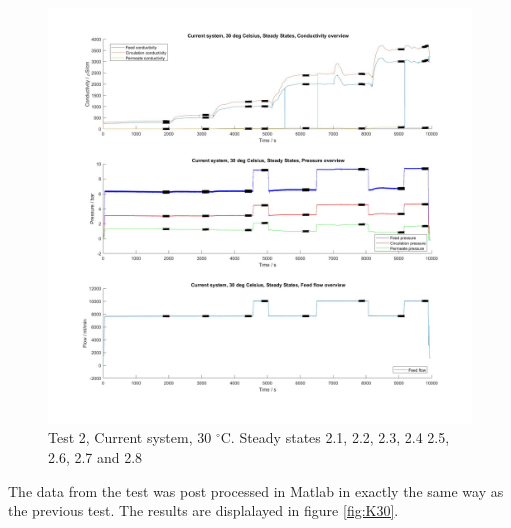 \begin{figure}[H]
    \centering
    \includegraphics[width=1.1\textwidth]{overview30}
    \caption{Test 2, Current system, 30 $^{\circ}$C. Steady states 2.1, 2.2, 2.3, 2.4 2.5, 2.6, 2.7 and 2.8}
    \label{fig:overw30}
\end{figure}

\newpage


The data from the test was post processed in Matlab in exactly the same way as the previous test. The results are displalayed in figure \ref{fig:K30}. 

